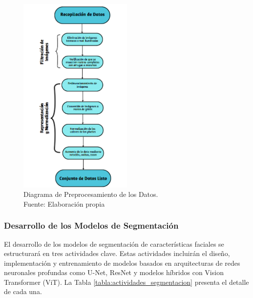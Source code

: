 \begin{figure}[H]
     \begin{center}
         \includegraphics[width=0.5\textwidth]{3/figures/Diagrama de preprocesamiento.png}
         \caption[Diagrama de Preprocesamiento de los Datos]{Diagrama de Preprocesamiento de los Datos.\\
         Fuente: Elaboración propia}
         \label{3:fig4}
     \end{center}
 \end{figure}


 \subsubsection{Desarrollo de los Modelos de Segmentación}
 El desarrollo de los modelos de segmentación de características faciales se estructurará en tres actividades clave. Estas actividades incluirán el diseño, implementación y entrenamiento de modelos basados en arquitecturas de redes neuronales profundas como U-Net, ResNet y modelos híbridos con Vision Transformer (ViT). La Tabla \ref{tabla:actividades_segmentacion} presenta el detalle de cada una.

